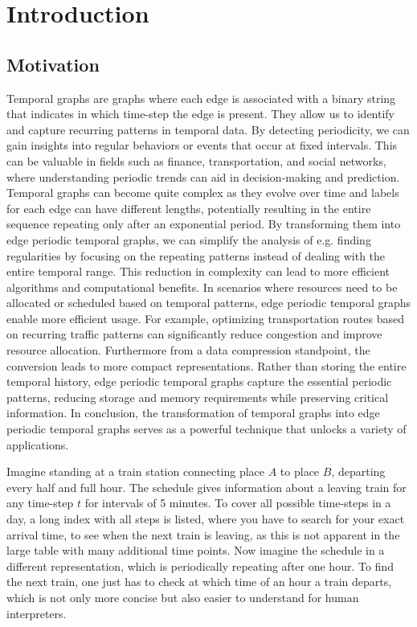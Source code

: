 \chapter{Introduction}
\label{ch:Introduction}
\section{Motivation}
\label{ch:Introduction:sec:Motivation}
Temporal graphs are graphs where each edge is associated with a binary string that indicates in which time-step the edge is present.
They allow us to identify and capture recurring patterns in temporal data.
By detecting periodicity, we can gain insights into regular behaviors or events that occur at fixed intervals.
This can be valuable in fields such as finance, transportation, and social networks, where understanding periodic trends can aid in decision-making and prediction.
Temporal graphs can become quite complex as they evolve over time and labels for each edge can have different lengths, potentially resulting in the entire sequence repeating only after an exponential period.
By transforming them into edge periodic temporal graphs, we can simplify the analysis of e.g. finding regularities by focusing on the repeating patterns instead of dealing with the entire temporal range.
This reduction in complexity can lead to more efficient algorithms and computational benefits.
In scenarios where resources need to be allocated or scheduled based on temporal patterns, edge periodic temporal graphs enable more efficient usage.
For example, optimizing transportation routes based on recurring traffic patterns can significantly reduce congestion and improve resource allocation.
Furthermore from a data compression standpoint, the conversion leads to more compact representations.
Rather than storing the entire temporal history, edge periodic temporal graphs capture the essential periodic patterns, reducing storage and memory requirements while preserving critical information.
In conclusion, the transformation of temporal graphs into edge periodic temporal graphs serves as a powerful technique that unlocks a variety of applications.

Imagine standing at a train station connecting place $A$ to place $B$, departing every half and full hour.
The schedule gives information about a leaving train for any time-step $t$ for intervals of 5 minutes.
To cover all possible time-steps in a day, a long index with all steps is listed, where you have to search for your exact arrival time, to see when the next train is leaving, as this is not apparent in the large table with many additional time points.
Now imagine the schedule in a different representation, which is periodically repeating after one hour.
To find the next train, one just has to check at which time of an hour a train departs, which is not only more concise but also easier to understand for human interpreters.
